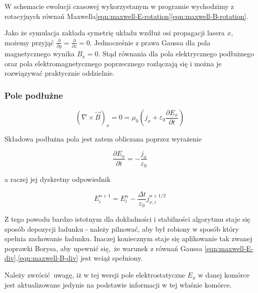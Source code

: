 
W schemacie ewolucji czasowej wykorzystanym w programie wychodzimy z rotacyjnych równań Maxwella\ref{eqn:maxwell-E-rotation}\ref{eqn:maxwell-B-rotation}.

Jako że symulacja zakłada symetrię układu wzdłuż osi propagacji lasera $x$,
możemy przyjąć $\frac{\partial}{\partial y} = \frac{\partial}{\partial z} =
0 $.  Jednocześnie z prawa Gaussa dla pola magnetycznego wynika $B_x = 0$.
Stąd równania dla pola elektrycznego podłużnego oraz pola
elektromagnetycznego poprzecznego rozłączają się i można je rozwiązywać praktycznie oddzielnie.

\subsubsection{Pole podłużne}

\begin{equation}
    \left(\nabla \times \vec{B}\right)_x = 0 = \mu_0 \left(j_x + \varepsilon_0 \frac{\partial E_x}{\partial t}\right)
    \label{eqn:longitudinal-field-eq}
 \end{equation}

Składowa podłużna pola jest zatem obliczana poprzez wyrażenie

\begin{equation}
\frac{\partial E_x}{\partial t} = - \frac{j_x}{\varepsilon_0}
\label{longitudinal-field-differential}
\end{equation}

a raczej jej dyskretny odpowiednik

\begin{equation}
    E_i^{n+1} = E_i^n - \frac{\Delta t}{\varepsilon_0} j_{x,i}^{n+1/2}
\label{longitudinal-field-finite-differential}
\end{equation}


Z tego powodu bardzo istotnym dla dokładności i stabilności algorytmu staje
się sposób depozycji ładunku - należy pilnować, aby był robiony w sposób
który spełnia zachowanie ładunku. Inaczej koniecznym staje się aplikowanie
tak zwanej poprawki Borysa, 
aby upewnić się, że warunek z równań Gaussa \ref{eqn:maxwell-E-div},\ref{eqn:maxwell-B-div}
jest wciąż spełniony.

Należy zwrócić uwagę, iż w tej wersji pole elektrostatyczne $E_x$ w danej komórce jest
aktualizowane jedynie na podstawie informacji w tej właśnie komórce.


